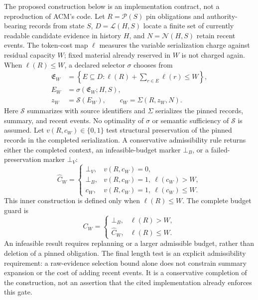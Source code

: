 The proposed construction below is an implementation contract, not a reproduction of ACM's code. Let $R=\mathcal P(S)$ pin obligations and authority-bearing records from state $S$, $D=\mathcal L(H,S)$ locate a finite set of currently readable candidate evidence in history $H$, and $N=\mathcal N(H,S)$ retain recent events. The token-cost map $\ell$ measures the variable serialization charge against residual capacity $W$; fixed material already reserved in $W$ is not charged again. When $\ell(R)\leq W$, a declared selector $\sigma$ chooses from
\begin{equation}
\begin{aligned}
 \mathfrak E_W
   &=\left\{E\subseteq D:
      \ell(R)+\sum_{r\in E}\ell(r)\leq W\right\},\\
 E_W&=\sigma(\mathfrak E_W;H,S),\\
 z_W&=\mathcal S(E_W),\qquad
 c_W=\Sigma(R,z_W,N).
\end{aligned}
\label{eq:C12:context-construction}
\end{equation}
Here $\mathcal S$ summarizes with source identifiers and $\Sigma$ serializes the pinned records, summary, and recent events. No optimality of $\sigma$ or semantic sufficiency of $\mathcal S$ is assumed. Let $v(R,c_W)\in\{0,1\}$ test structural preservation of the pinned records in the completed serialization. A conservative admissibility rule returns either the completed context, an infeasible-budget marker $\bot_B$, or a failed-preservation marker $\bot_V$:
\begin{equation}
 \widehat C_W=
 \begin{cases}
 \bot_V,&v(R,c_W)=0,\\
 \bot_B,&v(R,c_W)=1,\ \ell(c_W)>W,\\
 c_W,&v(R,c_W)=1,\ \ell(c_W)\leq W.
 \end{cases}
\label{eq:C12:context-admissibility}
\end{equation}
This inner construction is defined only when $\ell(R)\leq W$. The complete budget guard is
\begin{equation}
 C_W=
 \begin{cases}
 \bot_B,&\ell(R)>W,\\
 \widehat C_W,&\ell(R)\leq W.
 \end{cases}
\label{eq:C12:context-budget-guard}
\end{equation}
An infeasible result requires replanning or a larger admissible budget, rather than deletion of a pinned obligation. The final length test is an explicit admissibility requirement: a raw-evidence selection bound alone does not constrain summary expansion or the cost of adding recent events. It is a conservative completion of the construction, not an assertion that the cited implementation already enforces this gate.

